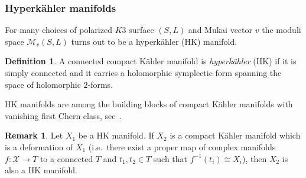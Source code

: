 \documentclass[11pt]{amsart}
\let\mathcal\mathscr
\def\cM{\mathcal{M}}
\def\cX{\mathcal{X}}
\theoremstyle{definition}
\newtheorem{dfn}[lmm]{Definition}
\newtheorem{rmk}[lmm]{Remark}
\theoremstyle{remark}
\begin{document}
\subsubsection{Hyperk\"ahler manifolds}\label{subsubsec:accakappa}
%
For many choices of polarized $K3$ surface $(S,L)$ and Mukai vector $v$ the moduli space $\cM_v(S,L)$ turns out to be a hyperk\"ahler (HK) manifold. 
%
\begin{dfn}
%
A connected compact K\"ahler manifold is \emph{hyperk\"ahler} (HK) if it is simply connected and it carries a holomorphic symplectic form spanning the space of holomorphic $2$-forms.
%
\end{dfn}
%
HK manifolds are among the building blocks of compact K\"ahler manifolds with vanishing first Chern class, see~\cite{beauv:ciunozero}.
%
%
\begin{rmk}\label{rmk:defhk}
%
Let $X_1$ be a HK manifold. If $X_2$ is a compact K\"ahler manifold which is a deformation of $X_1$ (i.e.~there exist a proper map of complex manifolds $f\colon \cX\to T$ to a connected $T$ and $t_1,t_2\in T$ such that  $f^{-1}(t_i)\cong X_i$), then $X_2$ is also  a HK manifold. 
%
\end{rmk}
%
%
\end{document}

